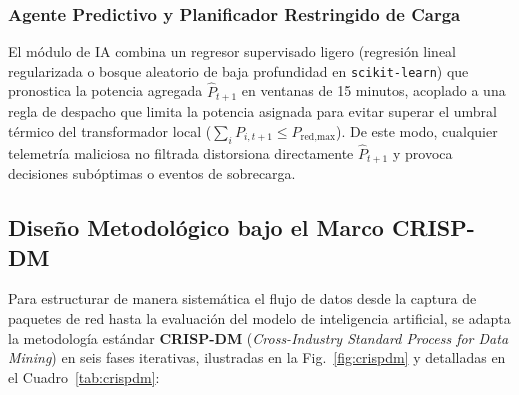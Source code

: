 \documentclass[conference]{IEEEtran}
\begin{document}
\subsubsection{Agente Predictivo y Planificador Restringido de Carga}
El módulo de IA combina un regresor supervisado ligero (regresión lineal regularizada o bosque aleatorio de baja profundidad en \texttt{scikit-learn}) que pronostica la potencia agregada $\hat{P}_{t+1}$ en ventanas de 15 minutos, acoplado a una regla de despacho que limita la potencia asignada para evitar superar el umbral térmico del transformador local ($\sum_i P_{i,t+1} \le P_{\text{red,max}}$). De este modo, cualquier telemetría maliciosa no filtrada distorsiona directamente $\hat{P}_{t+1}$ y provoca decisiones subóptimas o eventos de sobrecarga.

\subsection{Diseño Metodológico bajo el Marco CRISP-DM}

Para estructurar de manera sistemática el flujo de datos desde la captura de paquetes de red hasta la evaluación del modelo de inteligencia artificial, se adapta la metodología estándar \textbf{CRISP-DM} (\textit{Cross-Industry Standard Process for Data Mining}) \cite{chapman2000} en seis fases iterativas, ilustradas en la Fig.~\ref{fig:crispdm} y detalladas en el Cuadro~\ref{tab:crispdm}:
\end{document}
